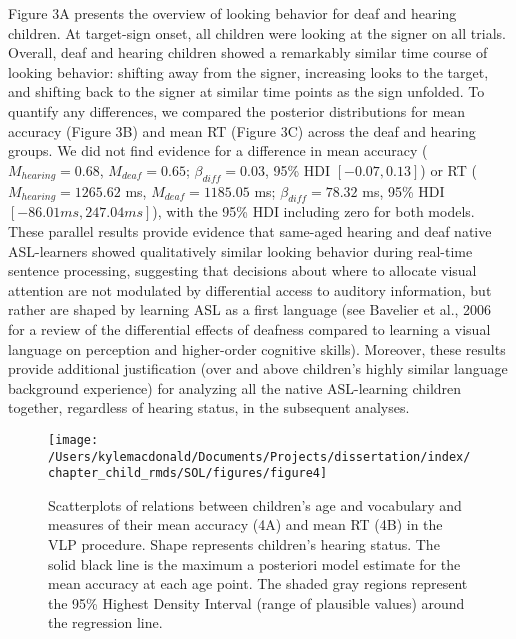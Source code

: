 \documentclass[oneside]{report}
\begin{document}
Figure 3A presents the overview of looking behavior for deaf and hearing
children. At target-sign onset, all children were looking at the signer
on all trials. Overall, deaf and hearing children showed a remarkably
similar time course of looking behavior: shifting away from the signer,
increasing looks to the target, and shifting back to the signer at
similar time points as the sign unfolded. To quantify any differences,
we compared the posterior distributions for mean accuracy (Figure 3B)
and mean RT (Figure 3C) across the deaf and hearing groups. We did not
find evidence for a difference in mean accuracy (\(M_{hearing} = 0.68\),
\(M_{deaf} = 0.65\); \(\beta_{diff} = 0.03\), 95\% HDI
\([-0.07, 0.13]\)) or RT (\(M_{hearing} = 1265.62\) ms,
\(M_{deaf} = 1185.05\) ms; \(\beta_{diff} = 78.32\) ms, 95\% HDI
\([-86.01 ms, 247.04 ms]\)), with the 95\% HDI including zero for both
models. These parallel results provide evidence that same-aged hearing
and deaf native ASL-learners showed qualitatively similar looking
behavior during real-time sentence processing, suggesting that decisions
about where to allocate visual attention are not modulated by
differential access to auditory information, but rather are shaped by
learning ASL as a first language (see Bavelier et al., 2006 for a review
of the differential effects of deafness compared to learning a visual
language on perception and higher-order cognitive skills). Moreover,
these results provide additional justification (over and above
children's highly similar language background experience) for analyzing
all the native ASL-learning children together, regardless of hearing
status, in the subsequent analyses.
\begin{figure}[!t]

{\centering \texttt{[image: /Users/kylemacdonald/Documents/Projects/dissertation/index/chapter\_child\_rmds/SOL/figures/figure4]} 

}

\caption[Scatterplots of relations between children's age and vocabulary and ASL processing]{Scatterplots of relations between children's age and vocabulary and measures of their mean accuracy (4A) and mean RT (4B) in the VLP procedure. Shape represents children's hearing status. The solid black line is the maximum a posteriori model estimate for the mean accuracy at each age point. The shaded gray regions represent the 95\% Highest Density Interval (range of plausible values) around the regression line.}\label{fig:sol-corr-figure}
\end{figure}
\end{document}
